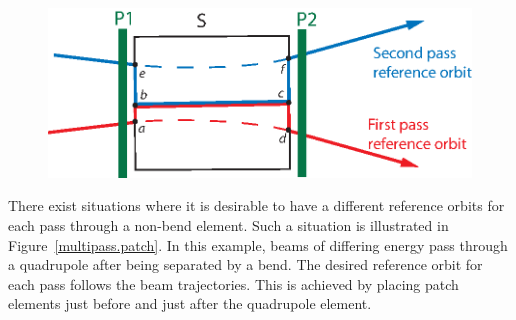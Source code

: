 \begin{figure}[tb]
\centering 
\includegraphics[width=6.2in]{multipass_patch.eps} 
\caption[Using patch elements to vary the reference orbit in a multipass line.]
{}
\label{f:multipass.patch}
\end{figure}

There exist situations where it is desirable to have a different
reference orbits for each pass through a non-bend element. Such a
situation is illustrated in Figure~\ref{multipass.patch}. In this
example, beams of differing energy pass through a quadrupole after
being separated by a bend. The desired reference orbit for each pass
follows the beam trajectories. This is achieved by placing patch
elements just before and just after the quadrupole element.

